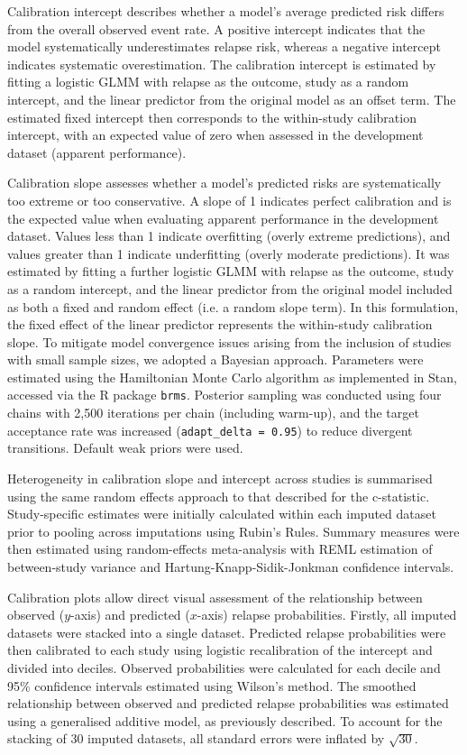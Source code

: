 Calibration intercept describes whether a model's average predicted risk differs from the overall observed event rate. A positive intercept indicates that the model systematically underestimates relapse risk, whereas a negative intercept indicates systematic overestimation. The calibration intercept is estimated by fitting a logistic GLMM with relapse as the outcome, study as a random intercept, and the linear predictor from the original model as an offset term. The estimated fixed intercept then corresponds to the within-study calibration intercept, with an expected value of zero when assessed in the development dataset (apparent performance)\cite{wynants2018}.

Calibration slope assesses whether a model's predicted risks are systematically too extreme or too conservative. A slope of 1 indicates perfect calibration and is the expected value when evaluating apparent performance in the development dataset. Values less than 1 indicate overfitting (overly extreme predictions), and values greater than 1 indicate underfitting (overly moderate predictions). It was estimated by fitting a further logistic GLMM with relapse as the outcome, study as a random intercept, and the linear predictor from the original model included as both a fixed and random effect (i.e. a random slope term)\cite{wynants2018}. In this formulation, the fixed effect of the linear predictor represents the within-study calibration slope. To mitigate model convergence issues arising from the inclusion of studies with small sample sizes, we adopted a Bayesian approach. Parameters were estimated using the Hamiltonian Monte Carlo algorithm as implemented in Stan, accessed via the R package \texttt{brms}\cite{burkner2017, stan_manual}. Posterior sampling was conducted using four chains with 2,500 iterations per chain (including warm-up), and the target acceptance rate was increased (\texttt{adapt\_delta = 0.95}) to reduce divergent transitions. Default weak priors were used.

Heterogeneity in calibration slope and intercept across studies is summarised using the same random effects approach to that described for the c-statistic. Study-specific estimates were initially calculated within each imputed dataset prior to pooling across imputations using Rubin's Rules\cite{burgess2013}. Summary measures were then estimated using random-effects meta-analysis with REML estimation of between-study variance and Hartung-Knapp-Sidik-Jonkman confidence intervals\cite{knapp2003}.

Calibration plots allow direct visual assessment of the relationship between observed ($y$-axis) and predicted ($x$-axis) relapse probabilities. Firstly, all imputed datasets were stacked into a single dataset. Predicted relapse probabilities were then calibrated to each study using logistic recalibration of the intercept and divided into deciles. Observed probabilities were calculated for each decile and 95\% confidence intervals estimated using Wilson's method\cite{wilson1927}. The smoothed relationship between observed and predicted relapse probabilities was estimated using a generalised additive model, as previously described. To account for the stacking of 30 imputed datasets, all standard errors were inflated by $\sqrt{30}$.

